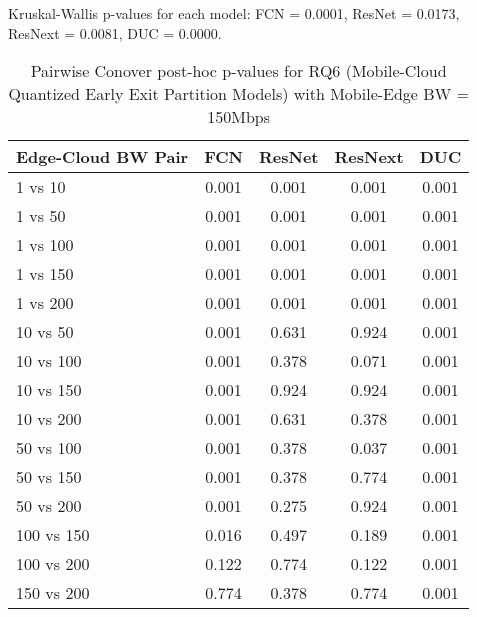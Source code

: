 \begin{table}[h]
\centering
\caption{Pairwise Conover post-hoc p-values for RQ6 (Mobile-Cloud Quantized Early Exit Partition Models) with Mobile-Edge BW = 150Mbps}
\label{tab:conover_mobile_cloud_quantized_earlyexit_partition_me150}
\smallskip
Kruskal-Wallis p-values for each model: FCN = 0.0001, ResNet = 0.0173, ResNext = 0.0081, DUC = 0.0000.

\begin{tabular}{lcccc}
\toprule
Edge-Cloud BW Pair & FCN & ResNet & ResNext & DUC \\
\midrule
1 vs 10 & 0.001 & 0.001 & 0.001 & 0.001 \\
1 vs 50 & 0.001 & 0.001 & 0.001 & 0.001 \\
1 vs 100 & 0.001 & 0.001 & 0.001 & 0.001 \\
1 vs 150 & 0.001 & 0.001 & 0.001 & 0.001 \\
1 vs 200 & 0.001 & 0.001 & 0.001 & 0.001 \\
10 vs 50 & 0.001 & 0.631 & 0.924 & 0.001 \\
10 vs 100 & 0.001 & 0.378 & 0.071 & 0.001 \\
10 vs 150 & 0.001 & 0.924 & 0.924 & 0.001 \\
10 vs 200 & 0.001 & 0.631 & 0.378 & 0.001 \\
50 vs 100 & 0.001 & 0.378 & 0.037 & 0.001 \\
50 vs 150 & 0.001 & 0.378 & 0.774 & 0.001 \\
50 vs 200 & 0.001 & 0.275 & 0.924 & 0.001 \\
100 vs 150 & 0.016 & 0.497 & 0.189 & 0.001 \\
100 vs 200 & 0.122 & 0.774 & 0.122 & 0.001 \\
150 vs 200 & 0.774 & 0.378 & 0.774 & 0.001 \\
\bottomrule
\end{tabular}
\end{table}

